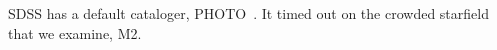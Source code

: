 



SDSS has a default cataloger, PHOTO~\cite{lupton2001sdss}. It timed out on the crowded starfield that we examine, M2. 

